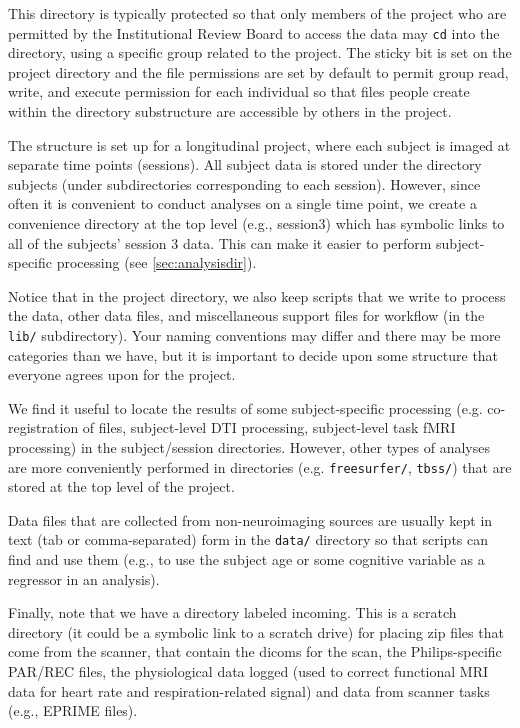 This directory is typically protected so that only members of the project who are permitted by the Institutional Review Board to access the data may \texttt{cd} into the directory, using a specific group related to the project. The sticky bit is set on the project directory and the file permissions are set by default to permit group read, write, and execute permission for each individual so that files people create within the directory substructure are accessible by others in the project. 


The structure is set up for a longitudinal project, where each subject is imaged at separate time points (sessions). All subject data is stored under the directory subjects (under subdirectories corresponding to each session). However, since often it is convenient to conduct analyses on a single time point, we create a convenience directory at the top level (e.g., session3) which has symbolic links to all of the subjects' session 3 data. This can make it easier to perform subject-specific processing (see \autoref{sec:analysisdir}).

Notice that in the project directory, we also keep scripts that we write to process the data, other data files, and miscellaneous support files for workflow (in the \texttt{lib/} subdirectory). Your naming conventions may differ and there may be more categories than we have, but it is important to decide upon some structure that everyone agrees upon for the project.

We find it useful to locate the results of some subject-specific processing (e.g. co-registration of files, subject-level DTI processing, subject-level task fMRI processing) in the subject/session directories. However, other types of analyses are more conveniently performed in directories (e.g. \texttt{freesurfer/}, \texttt{tbss/}) that are stored at the top level of the project.

Data files that are collected from non-neuroimaging sources are usually kept in text (tab or comma-separated) form in the \texttt{data/} directory so that scripts can find and use them (e.g., to use the subject age or some cognitive variable as a regressor in an analysis).

Finally, note that we have a directory labeled incoming. This is a scratch directory (it could be a symbolic link to a scratch drive) for placing zip files that come from the scanner, that contain the dicoms for the scan, the Philips-specific PAR/REC files, the physiological data logged (used to correct functional MRI data for heart rate and respiration-related signal) and data from scanner tasks (e.g., EPRIME files).

